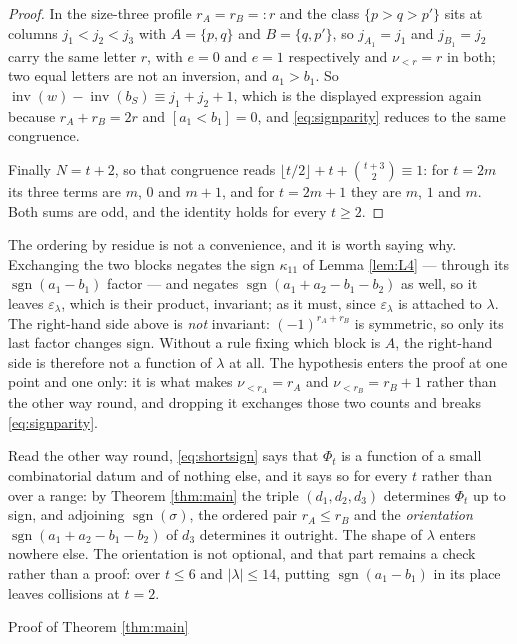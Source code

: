 \documentclass[11pt,reqno]{amsart}
\makeatletter
\renewcommand\section{\@startsection{section}{1}%
  \z@{\linespacing\@plus\linespacing}{.5\linespacing}%
  {\normalfont\large\bfseries\centering}}
\theoremstyle{plain}
\theoremstyle{definition}
\newcommand{\inv}{\operatorname{inv}}
\newcommand{\sgn}{\operatorname{sgn}}
\makeatother
\begin{document}
\begin{proof}
In the size-three profile $r_A=r_B=:r$ and the class $\{p>q>p'\}$ sits at columns $j_1<j_2<j_3$ with
$A=\{p,q\}$ and $B=\{q,p'\}$, so $j_{A_1}=j_1$ and $j_{B_1}=j_2$ carry the same letter $r$, with
$e=0$ and $e=1$ respectively and $\nu_{<r}=r$ in both; two equal letters are not an inversion, and
$a_1>b_1$. So $\inv(w)-\inv(b_S)\equiv j_1+j_2+1$, which is the displayed expression again because
$r_A+r_B=2r$ and $[a_1<b_1]=0$, and \eqref{eq:signparity} reduces to the same congruence.

Finally $N=t+2$, so that congruence reads $\lfloor t/2\rfloor+t+\binom{t+3}{2}\equiv1$: for $t=2m$
its three terms are $m$, $0$ and $m+1$, and for $t=2m+1$ they are $m$, $1$ and $m$. Both sums are
odd, and the identity holds for every $t\ge2$.
\end{proof}

The ordering by residue is not a convenience, and it is worth saying why. Exchanging the two blocks
negates the sign $\kappa_{11}$ of Lemma \ref{lem:L4} --- through its $\sgn(a_1-b_1)$ factor --- and negates
$\sgn(a_1+a_2-b_1-b_2)$ as well, so it leaves $\varepsilon_\lambda$, which is their product,
invariant; as it must, since $\varepsilon_\lambda$ is attached to $\lambda$. The right-hand side
above is \emph{not} invariant: $(-1)^{r_A+r_B}$ is symmetric, so only its last factor changes sign.
Without a rule fixing which block is $A$, the right-hand side is therefore not a function of
$\lambda$ at all. The hypothesis enters the proof at one point and one only: it is what makes
$\nu_{<r_A}=r_A$ and $\nu_{<r_B}=r_B+1$ rather than the other way round, and dropping it exchanges
those two counts and breaks \eqref{eq:signparity}.

Read the other way round, \eqref{eq:shortsign} says that $\Phi_t$ is a function of a small
combinatorial datum and of nothing else, and it says so for every $t$ rather than over a range: by
Theorem \ref{thm:main} the triple $(d_1,d_2,d_3)$ determines $\Phi_t$ up to sign, and adjoining
$\sgn(\sigma)$, the ordered pair $r_A\le r_B$ and the \emph{orientation}
$\sgn(a_1+a_2-b_1-b_2)$ of $d_3$ determines it outright. The shape of $\lambda$ enters nowhere else.
The orientation is not optional, and that part remains a check rather than a proof: over $t\le6$ and
$|\lambda|\le14$, putting $\sgn(a_1-b_1)$ in its place leaves collisions at $t=2$.

\section{Proof of Theorem \ref{thm:main}}\label{sec:proof}
\end{document}
